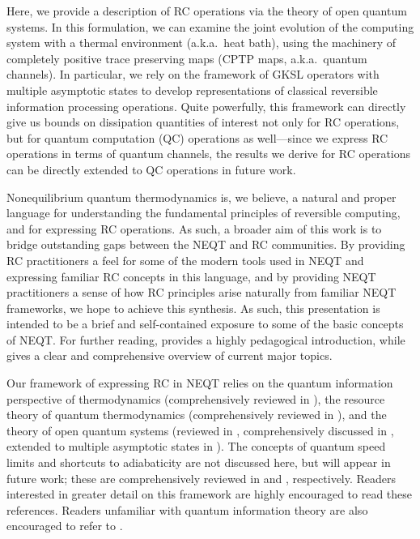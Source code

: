 \documentclass[preprints,article,accept,moreauthors,pdftex]{Definitions/mdpi}
\begin{document}
Here, we provide a description of RC operations via the theory of open quantum systems. In this formulation, we can examine the joint evolution of the computing system with a thermal environment (a.k.a.\ heat bath), using the machinery of completely positive trace preserving maps (CPTP maps, a.k.a.\ quantum channels). In particular, we rely on the framework of GKSL operators with multiple asymptotic states \cite{Albert14,ABFJ16,Albert18} to develop representations of classical reversible information processing operations. Quite powerfully, this framework can directly give us bounds on dissipation quantities of interest not only for RC operations, but for quantum computation (QC) operations as well---since we express RC operations in terms of quantum channels, the results we derive for RC operations can be directly extended to QC operations in future work.

Nonequilibrium quantum thermodynamics is, we believe, a natural and proper language for understanding the fundamental principles of reversible computing, and for expressing RC operations. As such, a broader aim of this work is to bridge outstanding gaps between the NEQT and RC communities. By providing RC practitioners a feel for some of the modern tools used in NEQT and expressing familiar RC concepts in this language, and by providing NEQT practitioners a sense of how RC principles arise naturally from familiar NEQT frameworks, we hope to achieve this synthesis. As such, this presentation is intended to be a brief and self-contained exposure to some of the basic concepts of NEQT. For further reading, \cite{DC19} provides a highly pedagogical introduction, while \cite{BCGAA18} gives a clear and comprehensive overview of current major topics.

Our framework of expressing RC in NEQT relies on the quantum information perspective of thermodynamics (comprehensively reviewed in \cite{GHRDS16}), the resource theory of quantum thermodynamics (comprehensively reviewed in \cite{NW18,Lostalgio19,CG19}), and the theory of open quantum systems (reviewed in \cite{Alicki07}, comprehensively discussed in \cite{Breuer07,Banerjee18}, extended to multiple asymptotic states in \cite{Albert14,ABFJ16,Albert18}). The concepts of quantum speed limits and shortcuts to adiabaticity are not discussed here, but will appear in future work; these are comprehensively reviewed in \cite{DC17} and \cite{GORKTMGM19}, respectively. Readers interested in greater detail on this framework are highly encouraged to read these references. Readers unfamiliar with quantum information theory are also encouraged to refer to \cite{NC00,NRS07,Wolf12,Attal14,Wilde17,Preskill19}.
\end{document}
